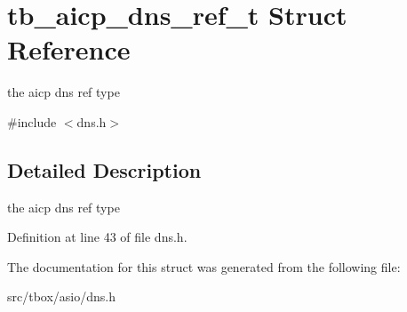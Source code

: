 \hypertarget{structtb__aicp__dns__ref__t}{\section{tb\-\_\-aicp\-\_\-dns\-\_\-ref\-\_\-t Struct Reference}
\label{structtb__aicp__dns__ref__t}
}


the aicp dns ref type  




{\ttfamily \#include $<$dns.\-h$>$}



\subsection{Detailed Description}
the aicp dns ref type 

Definition at line 43 of file dns.\-h.



The documentation for this struct was generated from the following file\-:\begin{DoxyCompactItemize}
\item 
src/tbox/asio/dns.\-h\end{DoxyCompactItemize}
